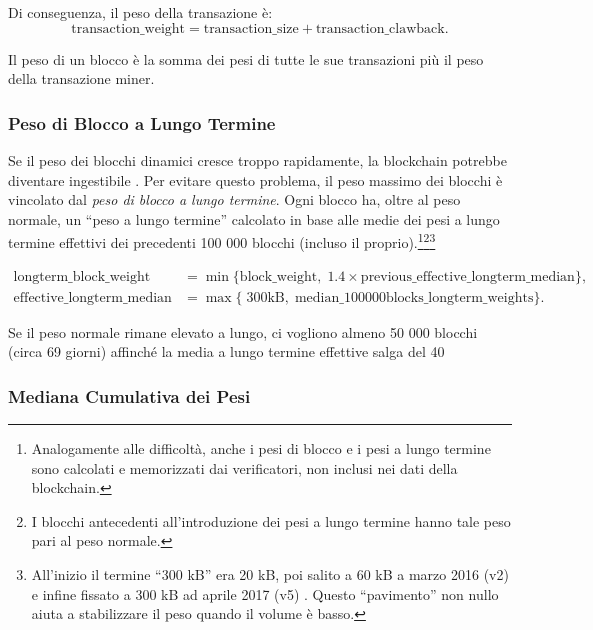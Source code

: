 Di conseguenza, il peso della transazione è:\vspace{.175cm}
\[
  \text{transaction\_weight}
    = \text{transaction\_size} + \text{transaction\_clawback}.
\]

Il peso di un blocco è la somma dei pesi di tutte le sue transazioni più il peso della transazione miner.

\subsubsection*{Peso di Blocco a Lungo Termine}

Se il peso dei blocchi dinamici cresce troppo rapidamente, la blockchain potrebbe diventare ingestibile \cite{big-bang-github}. Per evitare questo problema, il peso massimo dei blocchi è vincolato dal {\em peso di blocco a lungo termine}. Ogni blocco ha, oltre al peso normale, un “peso a lungo termine” calcolato in base alle medie dei pesi a lungo termine effettivi dei precedenti 100 000 blocchi (incluso il proprio).\footnote{Analogamente alle difficoltà, anche i pesi di blocco e i pesi a lungo termine sono calcolati e memorizzati dai verificatori, non inclusi nei dati della blockchain.}\footnote{I blocchi antecedenti all’introduzione dei pesi a lungo termine hanno tale peso pari al peso normale.}\footnote{All’inizio il termine “300 kB” era 20 kB, poi salito a 60 kB a marzo 2016 (v2) \cite{monero-0.9.3} e infine fissato a 300 kB ad aprile 2017 (v5) \cite{monero-v5}. Questo “pavimento” non nullo aiuta a stabilizzare il peso quando il volume è basso.}

\begin{align*}
  \text{longterm\_block\_weight}
    &= \min\{\text{block\_weight},\;1.4 \times \text{previous\_effective\_longterm\_median}\},\\
  \text{effective\_longterm\_median}
    &= \max\{\;300\text{kB},\;\text{median\_100000blocks\_longterm\_weights}\}.
\end{align*}

Se il peso normale rimane elevato a lungo, ci vogliono almeno 50 000 blocchi (circa 69 giorni) affinché la media a lungo termine effettive salga del 40 %

\subsubsection*{Mediana Cumulativa dei Pesi}


